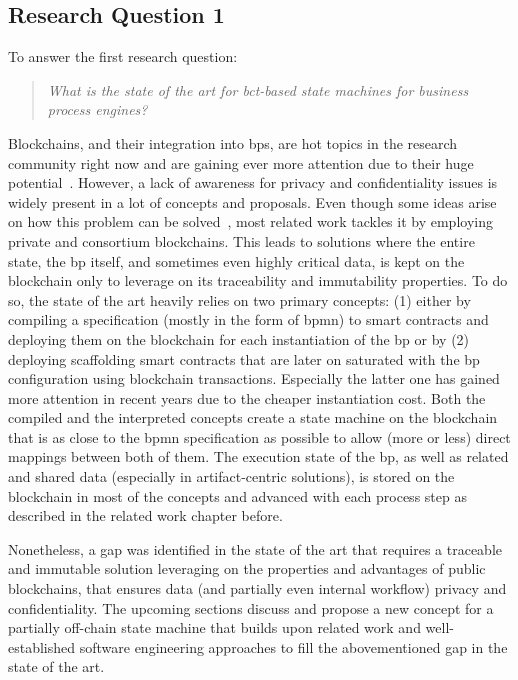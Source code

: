 \subsection{Research Question 1}
\label{sec:related-work:comparison:rq1}
To answer the first research question:

\begin{quote}
    \emph{What is the state of the art for \gls{bct}-based state machines for business process engines?}
\end{quote}

Blockchains, and their integration into \glspl{bp}, are hot topics in the research community right now and are gaining ever more attention due to their huge potential~\cite{blockchains_for_bpmn_challenges_and_opportunities}. However, a lack of awareness for privacy and confidentiality issues is widely present in a lot of concepts and proposals. Even though some ideas arise on how this problem can be solved~\cite{blockchain_for_secure_io_bp}, most related work tackles it by employing private and consortium blockchains. This leads to solutions where the entire state, the \gls{bp} itself, and sometimes even highly critical data, is kept on the blockchain only to leverage on its traceability and immutability properties. To do so, the state of the art heavily relies on two primary concepts: (1) either by compiling a specification (mostly in the form of \gls{bpmn}) to smart contracts and deploying them on the blockchain for each instantiation of the \gls{bp} or by (2) deploying scaffolding smart contracts that are later on saturated with the \gls{bp} configuration using blockchain transactions. Especially the latter one has gained more attention in recent years due to the cheaper instantiation cost. Both the compiled and the interpreted concepts create a state machine on the blockchain that is as close to the \gls{bpmn} specification as possible to allow (more or less) direct mappings between both of them. The execution state of the \gls{bp}, as well as related and shared data (especially in artifact-centric solutions), is stored on the blockchain in most of the concepts and advanced with each process step as described in the related work chapter before.

Nonetheless, a gap was identified in the state of the art that requires a traceable and immutable solution leveraging on the properties and advantages of public blockchains, that ensures data (and partially even internal workflow) privacy and confidentiality. The upcoming sections discuss and propose a new concept for a partially off-chain state machine that builds upon related work and well-established software engineering approaches to fill the abovementioned gap in the state of the art.
